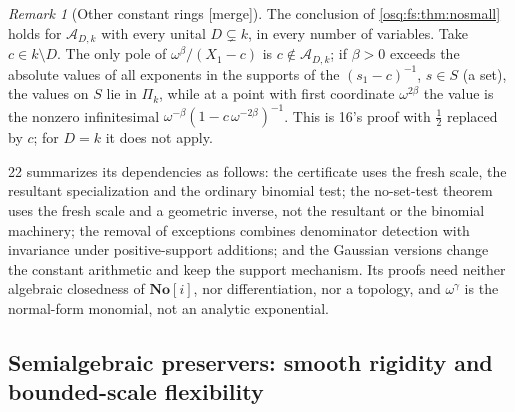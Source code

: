 \documentclass[11pt,letterpaper]{article}
\numberwithin{equation}{section}
\theoremstyle{definition}
\theoremstyle{remark}
\newtheorem{remark}[remark]{Remark}
\theoremstyle{plain}
\newcommand{\No}{\mathbf{No}}
\newcommand{\SC}{\No[i]}
\newcommand{\A}{\mathcal A}          %
\newcommand{\merge}{\textup{\textsf{[merge]}}}
\begin{document}
\begin{remark}[Other constant rings \merge]\label{osq:ft:rem:otherD}
The conclusion of \cref{osq:fs:thm:nosmall} holds for $\A_{D,k}$ with every unital $D\subsetneq k$, in every number of variables. Take $c\in k\setminus D$.
The only pole of $\omega^\beta/(X_1-c)$ is $c\notin\A_{D,k}$; if $\beta>0$ exceeds the absolute values of all exponents in the supports of the
$(s_1-c)^{-1}$, $s\in S$ (a set), the values on $S$ lie in $\Pi_k$, while at a point with first coordinate $\omega^{2\beta}$ the value is the nonzero
infinitesimal $\omega^{-\beta}(1-c\,\omega^{-2\beta})^{-1}$. This is 16's proof with $\frac12$ replaced by $c$; for $D=k$ it does not apply.
\end{remark}

22 summarizes its dependencies as follows: the certificate uses the fresh scale, the resultant specialization and the ordinary binomial test; the
no-set-test theorem uses the fresh scale and a geometric inverse, not the resultant or the binomial machinery; the removal of exceptions combines
denominator detection with invariance under positive-support additions; and the Gaussian versions change the constant arithmetic and keep the support
mechanism. Its proofs need neither algebraic closedness of $\SC$, nor differentiation, nor a topology, and $\omega^\gamma$ is the normal-form monomial,
not an analytic exponential.

\subsection{Semialgebraic preservers: smooth rigidity and bounded-scale flexibility}\label{osq:sa:sub:semialgebraic}
\end{document}
